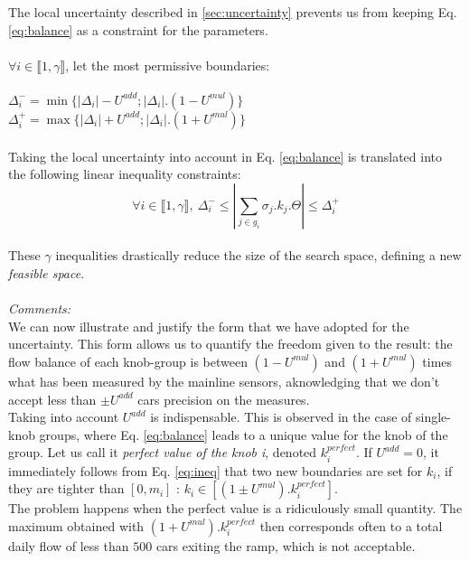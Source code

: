 The local uncertainty described in \ref{sec:uncertainty} prevents us from keeping Eq. \ref{eq:balance} as a constraint for the parameters.\\
\\
$\forall i \in {\llbracket 1,\gamma \rrbracket}$, let the most permissive boundaries:\\
\\
$\Delta_{i}^{-}=\min{\{|\Delta_{i}|-U^{add};|\Delta_{i}|.(1-U^{mul})\}}$\\
$\Delta_{i}^{+}=\max{\{|\Delta_{i}|+U^{add};|\Delta_{i}|.(1+U^{mul})\}}$\\
\\
Taking the local uncertainty into account in Eq. \ref{eq:balance} is translated into the following linear inequality constraints:\\
\begin{equation}
\label{eq:ineq}
	\forall i\in \llbracket 1,\gamma \rrbracket,\ \Delta_{i}^{-}\leq |\sum\limits_{j\in g_{i}}\sigma_{j}.k_{j}.\Theta| \leq \Delta_{i}^{+}
\end{equation}
\\
These $\gamma$ inequalities drastically reduce the size of the search space, defining a new \emph{feasible space}.\\
\\
\emph{Comments:}\\
We can now illustrate and justify the form that we have adopted for the uncertainty. This form allows us to quantify the freedom given to the result: the flow balance of each knob-group is between $(1-U^{mul})$ and $(1+U^{mul})$ times what has been measured by the mainline sensors, aknowledging that we don't accept less than $\pm U^{add}$ cars precision on the measures.\\
Taking into account $U^{add}$ is indispensable. This is observed in the case of single-knob groups, where Eq. \ref{eq:balance} leads to a unique value for the knob of the group. Let us call it \emph{perfect value of the knob i}, denoted $k_{i}^{perfect}$. If $U^{add}=0$, it immediately follows from Eq. \ref{eq:ineq} that two new boundaries are set for $k_{i}$, if they are tighter than $[0,m_{i}]$ : $k_{i}\in [(1\pm U^{mul}).k_{i}^{perfect}]$.\\
The problem happens when the perfect value is a ridiculously small quantity. The maximum obtained with $(1+ U^{mul}).k_{i}^{perfect}$ then corresponds often to a total daily flow of less than $500$ cars exiting the ramp, which is not acceptable.\\ 
\\
